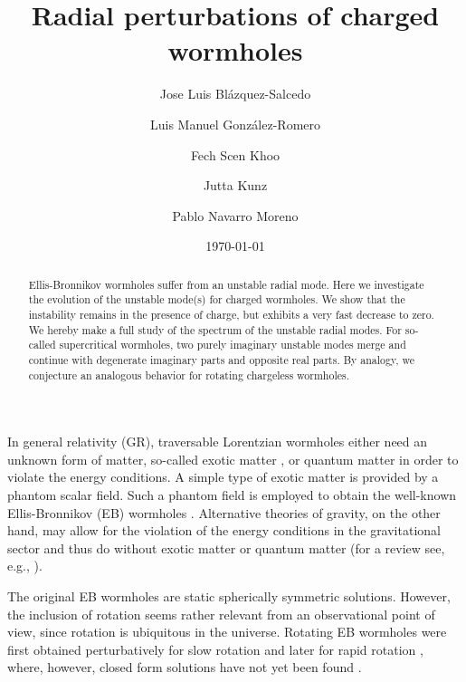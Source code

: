 \documentclass[floats,floatfix,showpacs,amssymb,prd,superscriptaddress,nofootinbib,nolongbibliography,reprint]{revtex4-2}
\newcommand\prlsec[1]{\vspace{2mm}\noindent {\textbf{  \textit{#1}}}}
\begin{document}
\title{{ 
Radial perturbations of charged wormholes}}

\author{Jose Luis Bl\'azquez-Salcedo} 
\author{Luis Manuel Gonz\'alez-Romero} 
\author{{Fech Scen Khoo}}
\author{{Jutta Kunz}}
\author{{Pablo Navarro Moreno}}

\date{\today}


\begin{abstract}

Ellis-Bronnikov wormholes suffer from an unstable radial mode.
Here we investigate the evolution of the unstable mode(s) for charged wormholes.
We show that the instability remains in the presence of charge, but exhibits a very fast decrease to zero.
{
We hereby make a full study of the spectrum of the unstable radial modes. 
}
For so-called supercritical wormholes, two purely imaginary unstable modes merge and continue with degenerate imaginary parts and opposite real parts.
By analogy, we conjecture an analogous behavior for rotating chargeless wormholes.
\end{abstract}

\maketitle


\prlsec{Introduction.}
In general relativity (GR), traversable Lorentzian wormholes either need an unknown form of matter, so-called exotic matter \cite{Morris:1988cz,Visser:1995cc,Ellis:1979bh}, or quantum matter \cite{Blazquez-Salcedo:2020czn,Konoplya:2021hsm,Blazquez-Salcedo:2021udn} in order to violate the energy conditions.
A simple type of exotic matter is provided by a phantom scalar field.
Such a phantom field is employed to obtain the well-known Ellis-Bronnikov (EB) wormholes \cite{Ellis:1973yv,Bronnikov:1973fh}.
Alternative theories of gravity, on the other hand, may allow for the violation of the energy conditions in the gravitational sector and thus do without exotic matter or quantum matter \cite{Kanti:2011jz,Harko:2013yb,Bakopoulos:2021liw} (for a review see, e.g., \cite{Lobo:2017cay}).

The original EB wormholes are static spherically symmetric solutions.
However, the inclusion of rotation seems rather relevant from an observational point of view, since rotation is ubiquitous in the universe.
Rotating EB wormholes were first obtained perturbatively for slow rotation \cite{Kashargin:2007mm,Kashargin:2008pk} and later for rapid rotation \cite{Kleihaus:2014dla,Chew:2016epf},
where, however, closed form solutions have not yet been found \cite{Volkov:2021blw}.
\end{document}
